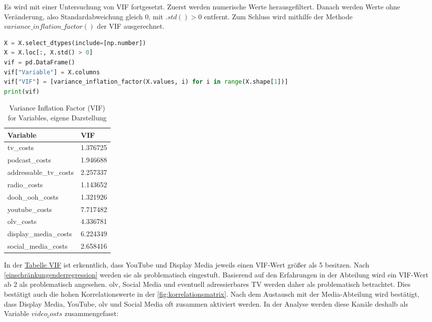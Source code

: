 Es wird mit einer Untersuchung von \ac{VIF} fortgesetzt. Zuerst werden numerische Werte herausgefiltert. Danach werden Werte ohne Veränderung, also Standardabweichung gleich 0, mit \(.std() > 0\) entfernt. Zum Schluss wird mithilfe der Methode \(variance\_inflation\_factor()\) der \ac{VIF} ausgerechnet. 
\begin{lstlisting}[language=Python, linewidth=\textwidth]
X = X.select_dtypes(include=[np.number]) 
X = X.loc[:, X.std() > 0]
vif = pd.DataFrame()
vif["Variable"] = X.columns
vif["VIF"] = [variance_inflation_factor(X.values, i) for i in range(X.shape[1])]
print(vif)
\end{lstlisting}
\begin{table}[h]
    \centering
    \begin{tabular}{@{}ll@{}}
        \toprule
        Variable               & VIF       \\ \midrule
        tv\_costs              & 1.376725  \\
        podcast\_costs         & 1.946688  \\
        addressable\_tv\_costs & 2.257337  \\
        radio\_costs           & 1.143652  \\
        dooh\_ooh\_costs       & 1.321926  \\
        youtube\_costs         & 7.717482  \\
        olv\_costs             & 4.336781  \\
        display\_media\_costs  & 6.224349  \\
        social\_media\_costs   & 2.658416  \\ \bottomrule
    \end{tabular}
    \label{tab:viftabelle}
    \caption{Variance Inflation Factor (VIF) for Variables, eigene Darstellung}
\end{table}
In der \hyperref[tab:viftabelle]{Tabelle VIF} ist erkenntlich, dass YouTube und Display Media jeweils einen \ac{VIF}-Wert größer als 5 besitzen. Nach \autoref{einschränkungenderregression} werden sie als problematisch eingestuft. Basierend auf den Erfahrungen in der Abteilung wird ein \ac{VIF}-Wert ab 2 als problematisch angesehen. \ac{olv}, Social Media und eventuell adressierbares TV werden daher als problematisch betrachtet. Dies bestätigt auch die hohen Korrelationswerte in der \autoref{fig:korrelationsmatrix}. Nach dem Austausch mit der Media-Abteilung wird bestätigt, dass Display Media, YouTube, \ac{olv} und Social Media oft zusammen aktiviert werden. In der Analyse werden diese Kanäle deshalb als Variable \(video_costs\) zusammengefasst: 

